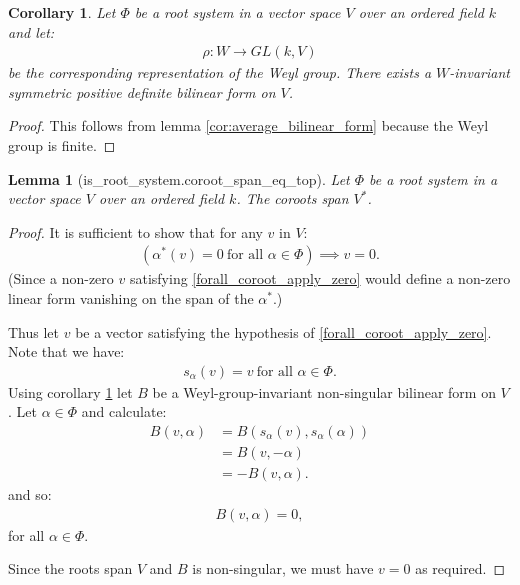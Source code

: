 \documentclass[12pt, a4paper]{article}
\newtheorem{lemma}{Lemma}[section]
\newtheorem{corollary}{Corollary}[section]
\begin{document}
\begin{corollary}\label{cor:weyl_invariant_bilinear}
  Let $\Phi$ be a root system in a vector space $V$ over an ordered field $k$ and let:
  \begin{align*}
    \rho : W \to GL(k, V)
  \end{align*}
  be the corresponding representation of the Weyl group. There exists a $W$-invariant symmetric
  positive definite bilinear form on $V$.
\end{corollary}
\begin{proof}
  This follows from lemma \ref{cor:average_bilinear_form} because the Weyl
  group is finite.
\end{proof}

\begin{lemma}[is\_root\_system.coroot\_span\_eq\_top]
  Let $\Phi$ be a root system in a vector space $V$ over an ordered field $k$. The coroots span
  $V^*$.
\end{lemma}
\begin{proof}
  It is sufficient to show that for any $v$ in $V$:
  \begin{align}\label{forall_coroot_apply_zero}
    (\alpha^*(v) = 0 ~\mbox{for all $\alpha \in \Phi$}) \implies v = 0.
  \end{align}
  (Since a non-zero $v$ satisfying \eqref{forall_coroot_apply_zero} would define a non-zero linear
  form vanishing on the span of the $\alpha^*$.)

  Thus let $v$ be a vector satisfying the hypothesis of \eqref{forall_coroot_apply_zero}. Note that
  we have:
  \begin{align*}
    s_\alpha(v) = v ~\mbox{for all $\alpha \in \Phi$}.
  \end{align*}
  Using corollary \ref{cor:weyl_invariant_bilinear} let $B$ be a Weyl-group-invariant non-singular
  bilinear form on $V$. Let $\alpha \in \Phi$ and calculate:
  \begin{align*}
    B(v, \alpha) &= B(s_\alpha(v), s_\alpha(\alpha))\\
                 &= B(v, -\alpha)\\
                 &= -B(v, \alpha).
  \end{align*}
  and so:
  \begin{align*}
    B(v, \alpha) = 0,
  \end{align*}
  for all $\alpha \in \Phi$.

  Since the roots span $V$ and $B$ is non-singular, we must have $v = 0$ as required.
\end{proof}



\end{document}
